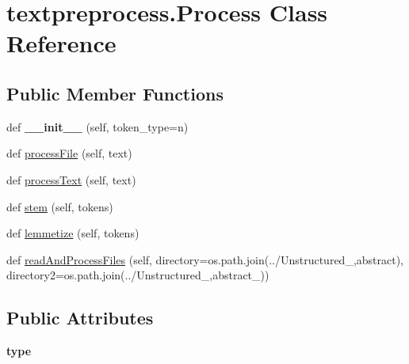 \hypertarget{classtextpreprocess_1_1_process}{}\section{textpreprocess.\+Process Class Reference}
\label{classtextpreprocess_1_1_process}
\subsection*{Public Member Functions}
\begin{DoxyCompactItemize}
\item 
def {\bfseries \+\_\+\+\_\+init\+\_\+\+\_\+} (self, token\+\_\+type=\textquotesingle{}n\textquotesingle{})\hypertarget{classtextpreprocess_1_1_process_a11ddde752763b87b089e5e709e7531d8}{}\label{classtextpreprocess_1_1_process_a11ddde752763b87b089e5e709e7531d8}

\item 
def \hyperlink{classtextpreprocess_1_1_process_a8ae54384642ccd5f1a682616f3aa90ae}{process\+File} (self, text)
\item 
def \hyperlink{classtextpreprocess_1_1_process_a55c261cfbf99c7c085c21b652a051c0b}{process\+Text} (self, text)
\item 
def \hyperlink{classtextpreprocess_1_1_process_a6523f58d5c1028d39e30363452044d60}{stem} (self, tokens)
\item 
def \hyperlink{classtextpreprocess_1_1_process_a3b12c1d82f82ade3033cc4fe071c3d67}{lemmetize} (self, tokens)
\item 
def \hyperlink{classtextpreprocess_1_1_process_a7fdd646913124569913bc838f88a9ffe}{read\+And\+Process\+Files} (self, directory=os.\+path.\+join(\textquotesingle{}../Unstructured\+\_\+\textquotesingle{},\textquotesingle{}abstract\textquotesingle{}), directory2=os.\+path.\+join(\textquotesingle{}../Unstructured\+\_\+\textquotesingle{},\textquotesingle{}abstract\+\_\+\textquotesingle{}))
\end{DoxyCompactItemize}
\subsection*{Public Attributes}
\begin{DoxyCompactItemize}
\item 
{\bfseries type}\hypertarget{classtextpreprocess_1_1_process_a79fe786561553b771bf7db0759d6d311}{}\label{classtextpreprocess_1_1_process_a79fe786561553b771bf7db0759d6d311}

\end{DoxyCompactItemize}


